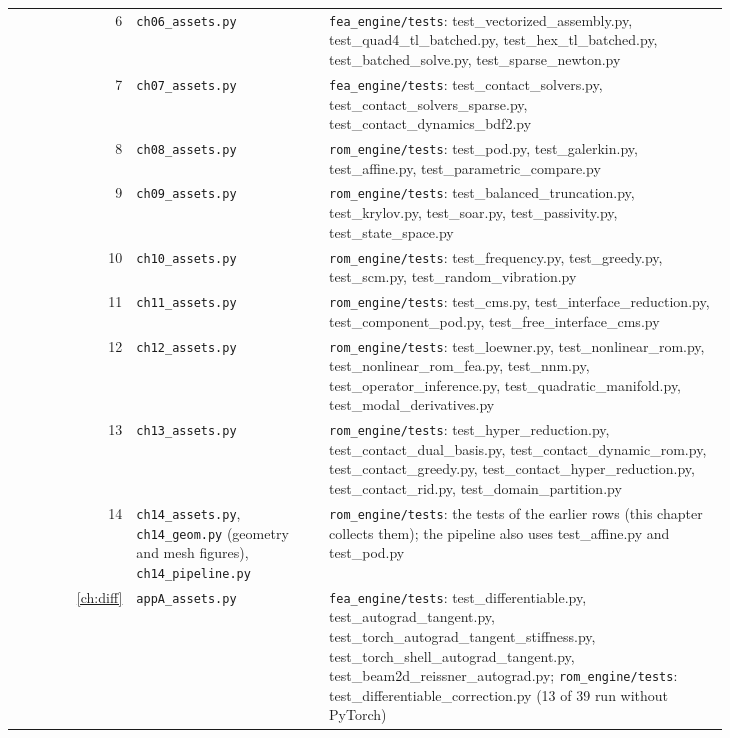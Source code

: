 \begin{longtable}{@{}r >{\raggedright\arraybackslash}p{0.27\linewidth} >{\raggedright\arraybackslash}p{0.56\linewidth}@{}}
6 & \texttt{ch06\_assets.py} & \texttt{fea\_engine/tests}: test\_vectorized\_assembly.py, test\_quad4\_tl\_batched.py, test\_hex\_tl\_batched.py, test\_batched\_solve.py, test\_sparse\_newton.py \\
7 & \texttt{ch07\_assets.py} & \texttt{fea\_engine/tests}: test\_contact\_solvers.py, test\_contact\_solvers\_sparse.py, test\_contact\_dynamics\_bdf2.py \\
8 & \texttt{ch08\_assets.py} & \texttt{rom\_engine/tests}: test\_pod.py, test\_galerkin.py, test\_affine.py, test\_parametric\_compare.py \\
9 & \texttt{ch09\_assets.py} & \texttt{rom\_engine/tests}: test\_balanced\_truncation.py, test\_krylov.py, test\_soar.py, test\_passivity.py, test\_state\_space.py \\
10 & \texttt{ch10\_assets.py} & \texttt{rom\_engine/tests}: test\_frequency.py, test\_greedy.py, test\_scm.py, test\_random\_vibration.py \\
11 & \texttt{ch11\_assets.py} & \texttt{rom\_engine/tests}: test\_cms.py, test\_interface\_reduction.py, test\_component\_pod.py, test\_free\_interface\_cms.py \\
12 & \texttt{ch12\_assets.py} & \texttt{rom\_engine/tests}: test\_loewner.py, test\_nonlinear\_rom.py, test\_nonlinear\_rom\_fea.py, test\_nnm.py, test\_operator\_inference.py, test\_quadratic\_manifold.py, test\_modal\_derivatives.py \\
13 & \texttt{ch13\_assets.py} & \texttt{rom\_engine/tests}: test\_hyper\_reduction.py, test\_contact\_dual\_basis.py, test\_contact\_dynamic\_rom.py, test\_contact\_greedy.py, test\_contact\_hyper\_reduction.py, test\_contact\_rid.py, test\_domain\_partition.py \\
14 & \texttt{ch14\_assets.py}, \texttt{ch14\_geom.py} (geometry and mesh figures), \texttt{ch14\_pipeline.py} & \texttt{rom\_engine/tests}: the tests of the earlier rows (this chapter collects them); the pipeline also uses test\_affine.py and test\_pod.py \\
\ref{ch:diff} & \texttt{appA\_assets.py} & \texttt{fea\_engine/tests}: test\_differentiable.py, test\_autograd\_tangent.py, test\_torch\_autograd\_tangent\_stiffness.py, test\_torch\_shell\_autograd\_tangent.py, test\_beam2d\_reissner\_autograd.py; \texttt{rom\_engine/tests}: test\_differentiable\_correction.py (13 of 39 run without PyTorch) \\
\end{longtable}
